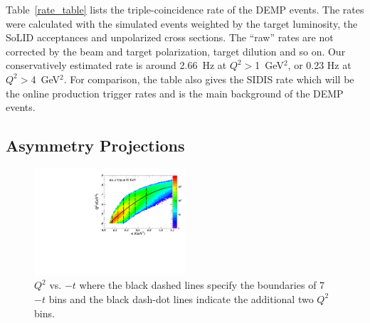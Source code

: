 Table~\ref{rate_table} lists the triple-coincidence rate of the DEMP
events. The rates were calculated with the simulated events weighted by the
target luminosity, the SoLID acceptances and unpolarized cross sections.  The
``raw'' rates are not corrected by the beam and target polarization, target
dilution and so on.  Our conservatively estimated rate is around 2.66~Hz at $Q^{2}>$1~GeV$^{2}$, or 0.23 Hz
at $Q^{2}>$4~GeV$^{2}$. For comparison, the table also gives the SIDIS rate
which will be the online production trigger rates and is the main background of
the DEMP events.

\subsection{Asymmetry Projections}
\begin{figure}[!ht]
 \begin{center}
      \includegraphics[type=pdf,
        ext=.pdf,read=.pdf,width=0.5\textwidth]{./figures/E11_Q2_t_bin_023Hz} 
    \caption[$Q^{2}$ vs. $-t$]{\footnotesize{$Q^{2}$ vs. $-t$ where the black
dashed lines specify the boundaries of 7 $-t$ bins and the black dash-dot lines
indicate the additional two $Q^{2}$ bins. }}
  \label{Q2_t_bin}
  \end{center}
\end{figure}

